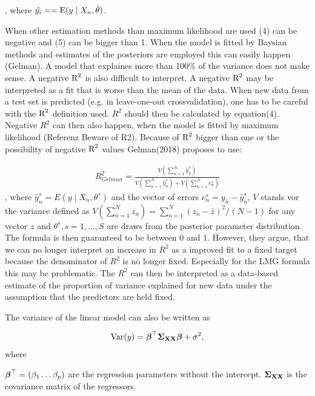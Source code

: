 \documentclass[11pt,a4paper,twoside]{book}
\begin{document}
, where $\hat{y_{i}} = = \operatorname{E} ({y \mid X_{n}, \hat{\theta}})$.  

When other estimation methods than maximum likelihood are used (4) can be negative and (5) can be bigger than 1. When the model is fitted by Baysian methods and estimates of the posteriors are employed this can easily happen (Gelman). A model that explaines more than 100\% of the variance does not make sense. A negative $\text{R}^2$ is also difficult to interpret. A negative $\text{R}^2$ may be interpreted as a fit that is worse than the mean of the data. When new data from a test set is predicted (e.g. in leave-one-out crossvalidation), one has to be careful with the $\text{R}^2$ definition used. $R^2$ should then be calculated by equation(4). Negative $R^2$ can then also happen, when the model is fitted by maximum likelihood (Referenz Beware of R2).  Because of $\text{R}^2$ bigger than one or the possibility of negative $\text{R}^2$ values Gelman(2018) proposes to use:

      \begin{align} 
        R^2_{Gelman} = \frac{V(\sum_{n=1}^{N}\hat{y}^s_{n})}{V(\sum_{n=1}^{N}\hat{y}^s_{n})+V(\sum_{n=1}^{N}e^s_{n})} \label{eq:6} 
   \end{align} 
, where $\hat{y}^s_{n}  = E \left({y \mid X_{n}, \theta^s}\right) $ and the vector of errors $e^s_{n} = y_{n} - \hat{y}^s_{n}$, $V$ stands vor the variance defined as $V(\sum_{n=1}^{N} z_{n}) = \sum_{n=1}^{N} (z_{n} - \bar{z})^2 / (N-1)$ for any vector $z$ and $\theta^s, s = 1, ... , S$ are draws from the posterior parameter distribution. The formula is then guaranteed to be between 0 and 1.  However, they argue, that we can no longer interpret an increase in $R^2$ as a improved fit to a fixed target because the denominator of $R^2$ is no longer fixed. Especially for the LMG formula this may be problematic. The $R^2$ can then be interpreted as a data-based estimate of the proportion of variance explained for new data under the assumption that the predictors are held fixed. 

The variance of the linear model can also be written as 

      \begin{align} 
        \operatorname{Var}(y) = {\boldsymbol{\beta}}^\top {\boldsymbol{\Sigma}}{}_{{\mathbf{X}} {\mathbf{X}}}  {\boldsymbol{\beta}} + \sigma^2, \label{eq:6} 
   \end{align}
where 

${\boldsymbol{\beta}}^\top = (\beta_{1} \dots \beta_{p})$ are the regression parameters without the intercept.
${\boldsymbol{\Sigma}}{}_{{\mathbf{X}} {\mathbf{X}}}$ is the covariance matrix of the regressors.
\end{document}
